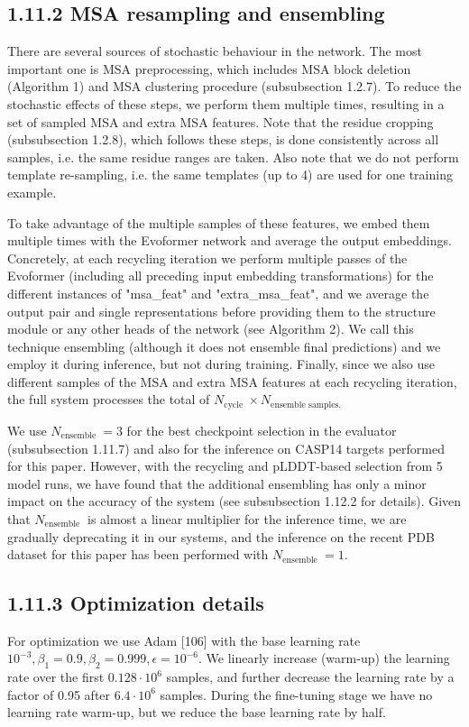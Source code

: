 \documentclass[10pt]{article}
\begin{document}
\subsection*{1.11.2 MSA resampling and ensembling}
There are several sources of stochastic behaviour in the network. The most important one is MSA preprocessing, which includes MSA block deletion (Algorithm 1) and MSA clustering procedure (subsubsection 1.2.7). To reduce the stochastic effects of these steps, we perform them multiple times, resulting in a set of sampled MSA and extra MSA features. Note that the residue cropping (subsubsection 1.2.8), which follows these steps, is done consistently across all samples, i.e. the same residue ranges are taken. Also note that we do not perform template re-sampling, i.e. the same templates (up to 4) are used for one training example.

To take advantage of the multiple samples of these features, we embed them multiple times with the Evoformer network and average the output embeddings. Concretely, at each recycling iteration we perform multiple passes of the Evoformer (including all preceding input embedding transformations) for the different instances of "msa\_feat" and "extra\_msa\_feat", and we average the output pair and single representations before providing them to the structure module or any other heads of the network (see Algorithm 2). We call this technique ensembling (although it does not ensemble final predictions) and we employ it during inference, but not during training. Finally, since we also use different samples of the MSA and extra MSA features at each recycling iteration, the full system processes the total of $N_{\text {cycle }} \times N_{\text {ensemble samples. }}$

We use $N_{\text {ensemble }}=3$ for the best checkpoint selection in the evaluator (subsubsection 1.11.7) and also for the inference on CASP14 targets performed for this paper. However, with the recycling and pLDDT-based selection from 5 model runs, we have found that the additional ensembling has only a minor impact on the accuracy of the system (see subsubsection 1.12.2 for details). Given that $N_{\text {ensemble }}$ is almost a linear multiplier for the inference time, we are gradually deprecating it in our systems, and the inference on the recent PDB dataset for this paper has been performed with $N_{\text {ensemble }}=1$.

\subsection*{1.11.3 Optimization details}
For optimization we use Adam [106] with the base learning rate $10^{-3}, \beta_{1}=0.9, \beta_{2}=0.999, \epsilon=10^{-6}$. We linearly increase (warm-up) the learning rate over the first $0.128 \cdot 10^{6}$ samples, and further decrease the learning rate by a factor of 0.95 after $6.4 \cdot 10^{6}$ samples. During the fine-tuning stage we have no learning rate warm-up, but we reduce the base learning rate by half.
\end{document}

